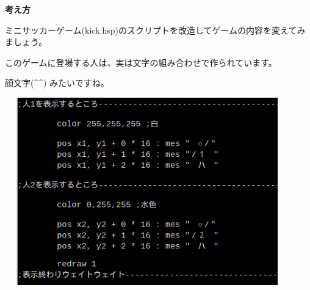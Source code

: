 \documentclass[a4paper,dvipdfmx]{jarticle}
\begin{document}
\bigskip

{\bfseries
考え方}


\bigskip

ミニサッカーゲーム(kick.hsp)のスクリプトを改造してゲームの内容を変えてみましょう。


\bigskip

このゲームに登場する人は、実は文字の組み合わせで作られています。

顔文字(\^{}\^{}) みたいですね。


\bigskip



\begin{center}
\includegraphics[width=12.326cm,height=8.123cm]{text04-img/text04-img007.png}

\end{center}

\bigskip


\bigskip


\bigskip


\bigskip


\bigskip


\bigskip


\bigskip


\bigskip


\bigskip


\bigskip


\bigskip


\bigskip


\bigskip


\bigskip


\bigskip


\bigskip


\bigskip


\bigskip
\end{document}
